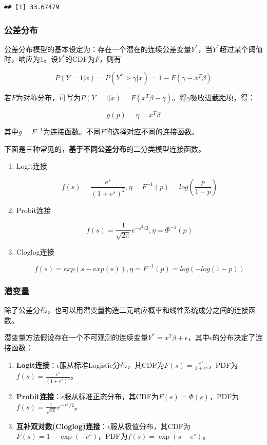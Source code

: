 \documentclass[
]{book}
\begin{document}
\begin{verbatim}
## [1] 33.67479
\end{verbatim}

\subsubsection{公差分布}\label{ux516cux5deeux5206ux5e03}

公差分布模型的基本设定为：存在一个潜在的连续公差变量\(Y^*\)，当\(Y^*\)超过某个阈值时，响应为1。设\(Y^*\)的CDF为\(F\)，则有

\[P(Y=1 | x) = P(Y^* > \gamma | x) = 1 - F(\gamma - x^T\beta)\]

若\(F\)为对称分布，可写为\(P(Y=1 | x) = F(x^T\beta - \gamma)\)。将\(\gamma\)吸收进截距项，得：

\[g(p) = \eta = x^T\beta\]

其中\(g = F^{-1}\)为连接函数。不同\(F\)的选择对应不同的连接函数。

下面是三种常见的，\textbf{基于不同公差分布}的二分类模型连接函数。

\begin{enumerate}
\def\labelenumi{\arabic{enumi}.}
\item
  Logit连接

  \[
  f(s)=\frac{e^s}{(1+e^s)^2},\eta=F^{-1}(p)=log(\frac{p}{1-p})
  \]
\item
  Probit连接

  \[
  f(s)=\frac{1}{\sqrt{2\pi}}e^{-s^2/2} ,\eta=\Phi^{-1}(p)
  \]
\item
  Cloglog连接

  \[
  f(s)=exp(s-exp(s)),\eta=F^{-1}(p)=log(-log(1-p))
  \]
\end{enumerate}

\subsubsection{潜变量}\label{ux6f5cux53d8ux91cf}

除了公差分布，也可以用潜变量构造二元响应概率和线性系统成分之间的连接函数。

潜变量方法假设存在一个不可观测的连续变量\(Y^* = x^T\beta + \epsilon\)，其中\(\epsilon\)的分布决定了连接函数：

\begin{enumerate}
\def\labelenumi{\arabic{enumi}.}
\item
  \textbf{Logit连接}：\(\epsilon\)服从标准Logistic分布，其CDF为\(F(s) = \frac{e^s}{1+e^s}\)，PDF为\(f(s) = \frac{e^s}{(1+e^s)^2}\)。
\item
  \textbf{Probit连接}：\(\epsilon\)服从标准正态分布，其CDF为\(F(s) = \Phi(s)\)，PDF为\(f(s) = \frac{1}{\sqrt{2\pi}} e^{-s^2/2}\)。
\item
  \textbf{互补双对数(Cloglog)连接}：\(\epsilon\)服从极值分布，其CDF为\(F(s) = 1 - \exp(-e^s)\)，PDF为\(f(s) = \exp(s - e^s)\)。
\end{enumerate}
\end{document}
